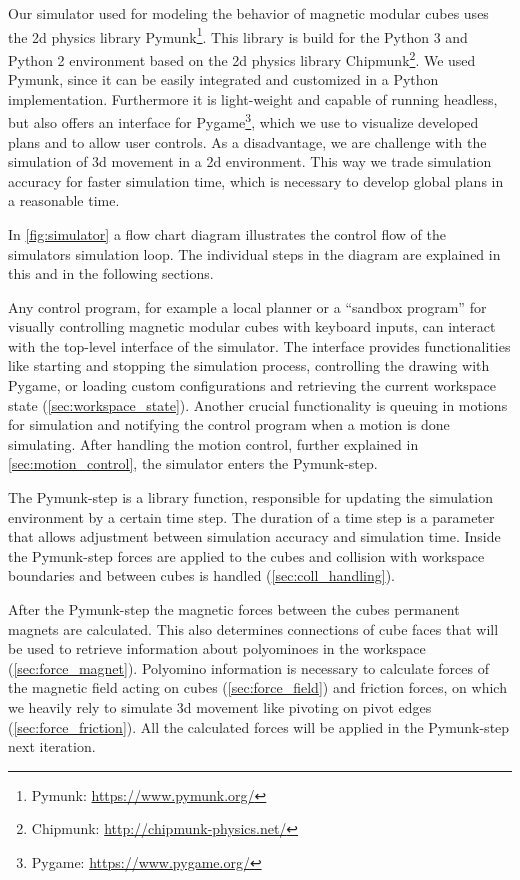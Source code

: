 Our simulator used for modeling the behavior of magnetic modular cubes uses the 2d physics library Pymunk\footnote{Pymunk: \url{https://www.pymunk.org/}}.
This library is build for the Python 3 and Python 2 environment based on the 2d physics library Chipmunk\footnote{Chipmunk: \url{http://chipmunk-physics.net/}}.
We used Pymunk, since it can be easily integrated and customized in a Python implementation.
Furthermore it is light-weight and capable of running headless, but also offers an interface for Pygame\footnote{Pygame: \url{https://www.pygame.org/}}, which we use to visualize developed plans and to allow user controls.
As a disadvantage, we are challenge with the simulation of 3d movement in a 2d environment.
This way we trade simulation accuracy for faster simulation time, which is necessary to develop global plans in a reasonable time.

In \autoref{fig:simulator} a flow chart diagram illustrates the control flow of the simulators simulation loop.
The individual steps in the diagram are explained in this and in the following sections.

Any control program, for example a local planner or a ``sandbox program'' for visually controlling magnetic modular cubes with keyboard inputs, can interact with the top-level interface of the simulator.
The interface provides functionalities like starting and stopping the simulation process, controlling the drawing with Pygame, or loading custom configurations and retrieving the current workspace state (\autoref{sec:workspace_state}).
Another crucial functionality is queuing in motions for simulation and notifying the control program when a motion is done simulating.
After handling the motion control, further explained in \autoref{sec:motion_control}, the simulator enters the Pymunk-step.

The Pymunk-step is a library function, responsible for updating the simulation environment by a certain time step.
The duration of a time step is a parameter that allows adjustment between simulation accuracy and simulation time. 
Inside the Pymunk-step forces are applied to the cubes and collision with workspace boundaries and between cubes is handled (\autoref{sec:coll_handling}).

After the Pymunk-step the magnetic forces between the cubes permanent magnets are calculated.
This also determines connections of cube faces that will be used to retrieve information about polyominoes in the workspace (\autoref{sec:force_magnet}).
Polyomino information is necessary to calculate forces of the magnetic field acting on cubes (\autoref{sec:force_field}) and friction forces, on which we heavily rely to simulate 3d movement like pivoting on pivot edges (\autoref{sec:force_friction}).
All the calculated forces will be applied in the Pymunk-step next iteration.


